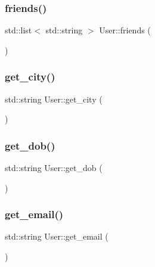 \subsubsection{\texorpdfstring{friends()}{friends()}}
{\footnotesize\ttfamily std\+::list$<$ std\+::string $>$ User\+::friends (\begin{DoxyParamCaption}{ }\end{DoxyParamCaption})}

\mbox{\label{classUser_a0b1c6d729cb6260557efcc614019ad3d}} 
\subsubsection{\texorpdfstring{get\+\_\+city()}{get\_city()}}
{\footnotesize\ttfamily std\+::string User\+::get\+\_\+city (\begin{DoxyParamCaption}{ }\end{DoxyParamCaption})}

\mbox{\label{classUser_a6f128d38b5cf38e1345b109f7264624f}} 
\subsubsection{\texorpdfstring{get\+\_\+dob()}{get\_dob()}}
{\footnotesize\ttfamily std\+::string User\+::get\+\_\+dob (\begin{DoxyParamCaption}{ }\end{DoxyParamCaption})}

\mbox{\label{classUser_afced0a5a8d577143c88f9ec8d36e0510}} 
\subsubsection{\texorpdfstring{get\+\_\+email()}{get\_email()}}
{\footnotesize\ttfamily std\+::string User\+::get\+\_\+email (\begin{DoxyParamCaption}{ }\end{DoxyParamCaption})}

\mbox{\label{classUser_a86c6040cbc76ac12c7f154b054bd1035}} 
